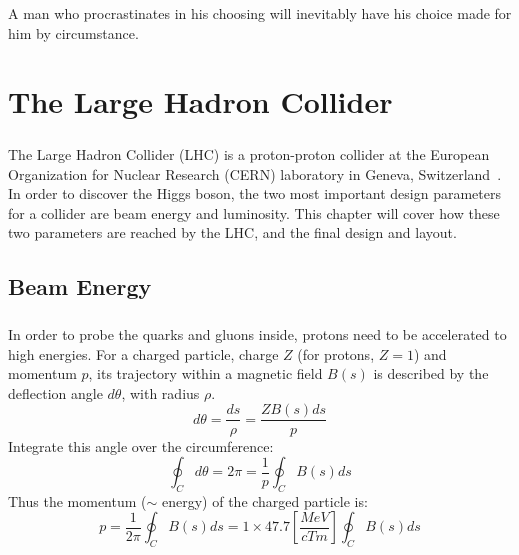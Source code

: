 \begin{savequote}[75mm]
A man who procrastinates in his choosing will inevitably have his choice made for him by circumstance.
\end{savequote}

\chapter{The Large Hadron Collider}

\paragraph{}
The Large Hadron Collider (LHC) is a proton-proton collider at the European Organization for Nuclear Research (CERN) laboratory in Geneva, Switzerland~\cite{LHCPaper}. In order to discover the Higgs boson, the two most important design parameters for a collider are beam energy and luminosity. This chapter will cover how these two parameters are reached by the LHC, and the final design and layout.

\section{Beam Energy}
\paragraph{}
In order to probe the quarks and gluons inside, protons need to be accelerated to high energies. For a charged particle, charge $Z$ (for protons, $Z=1$) and momentum $p$, its trajectory within a magnetic field $B(s)$ is described by the deflection angle $d\theta$, with radius $\rho$.
%
\begin{equation}
d\theta = \frac{ds}{\rho} = \frac{ZB(s)ds}{p}
\end{equation}
Integrate this angle over the circumference:
\begin{equation}
\oint_C d\theta = 2\pi = \frac{1}{p} \oint_C B(s)ds
\end{equation}
Thus the momentum ($\sim$ energy) of the charged particle is:
\begin{equation}
\label{Ch2:eq-p}
p = \frac{1}{2\pi}\oint_C B(s)ds = 1 \times 47.7[\frac{MeV}{cTm}] \oint_C B(s)ds
\end{equation}
%
